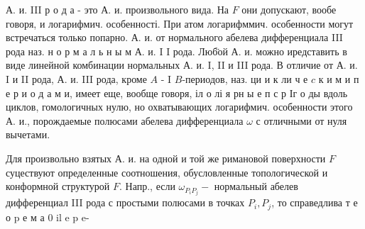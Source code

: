 \documentclass[10pt]{article}
\begin{document}
А. и. III р о д а - это А. и. произвольного вида. На $F$ они допускают, вообе говоря, и логарифмич. особенності. При атом логарифммич. особенности могут встречаться только попарно. А. и. от нормального абелева дифференциала III рода наз. н о р м а л ь н ы м А. и. I I рода. Люб̈ой А. и. можно иредставить в виде линейной комбинации нормальных А. и. I, II и III рода. В отличие от А. и. I и II рода, А. и. III рода, кроме $A$ - I $B$-периодов, наз. ци и к ли ч е $c$ к и м и п е р и о д а м и, имеет еще, вообще говоря, іл о лі я рн ы е п с р Іг о ды вдоль циклов, гомологичных нулю, но охватывающих логарифмич. особенности этого А. и., порождаемые полюсами абелева дифференциала $\omega$ с отличными от нуля вычетами.

Для произвольно взятых А. и. на одной и той же римановой поверхности $F$ суцествуют определенные соотношения, обусловленные топологической и конформной структурой $F$. Напр., если $\omega_{P_{i} P_{j}}-$ нормальный абелев дифференциал III рода с простыми полюсами в точках $P_{i}, P_{j}$, то справедлива т е о p е м а 0 il e p e-
\end{document}
